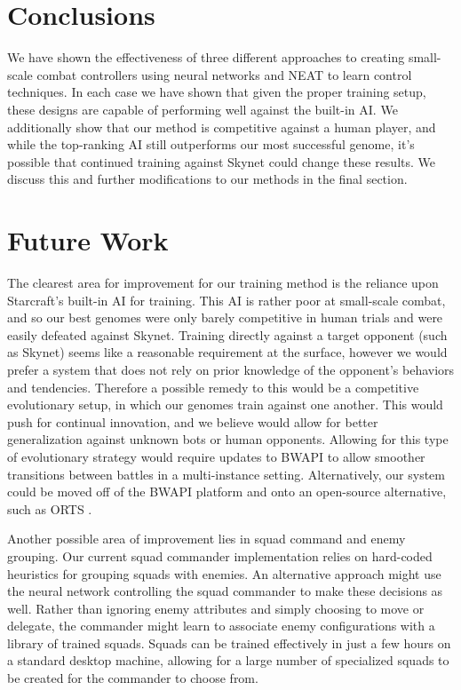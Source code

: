 \documentclass[10pt,a4paper,twocolumn]{article}
\begin{document}
\section{Conclusions}
\label{sec:conclusion}

We have shown the effectiveness of three different approaches to creating small-scale combat controllers using neural networks and NEAT to learn control techniques. In each case we have shown that given the proper training setup, these designs are capable of performing well against the built-in AI. We additionally show that our method is competitive against a human player, and while the top-ranking AI still outperforms our most successful genome, it's possible that continued training against Skynet could change these results. We discuss this and further modifications to our methods in the final section.

\section{Future Work}
\label{sec:future}

The clearest area for improvement for our training method is the reliance upon Starcraft's built-in AI for training. This AI is rather poor at small-scale combat, and so our best genomes were only barely competitive in human trials and were easily defeated against Skynet. Training directly against a target opponent (such as Skynet) seems like a reasonable requirement at the surface, however we would prefer a system that does not rely on prior knowledge of the opponent's behaviors and tendencies. Therefore a possible remedy to this would be a competitive evolutionary setup, in which our genomes train against one another. This would push for continual innovation, and we believe would allow for better generalization against unknown bots or human opponents. Allowing for this type of evolutionary strategy would require updates to BWAPI to allow smoother transitions between battles in a multi-instance setting. Alternatively, our system could be moved off of the BWAPI platform and onto an open-source alternative, such as ORTS \cite{orts}.

Another possible area of improvement lies in squad command and enemy grouping. Our current squad commander implementation relies on hard-coded heuristics for grouping squads with enemies. An alternative approach might use the neural network controlling the squad commander to make these decisions as well. Rather than ignoring enemy attributes and simply choosing to move or delegate, the commander might learn to associate enemy configurations with a library of trained squads. Squads can be trained effectively in just a few hours on a standard desktop machine, allowing for a large number of specialized squads to be created for the commander to choose from.
\end{document}
